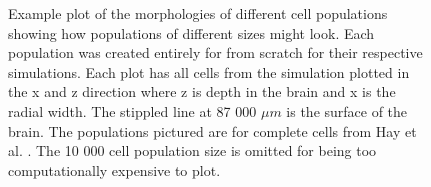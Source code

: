 \documentclass[final, a4paper,masters,en,listoffigures,listoftables,norwegiandates]{NMBU}
\begin{document}
\begin{figure}[htbp]
    \centering
    \caption{Example plot of the morphologies of different cell populations showing how populations of different sizes might look. Each population was created entirely for from scratch for their respective simulations. Each plot has all cells from the simulation plotted in the x and z direction where z is depth in the brain and x is the radial width. The stippled line at 87 000 $\mu m$ is the surface of the brain. The populations pictured are for complete cells from Hay et al. \cite{Hay2011}. The 10 000 cell population size is omitted for being too computationally expensive to plot.}
    \label{fig:popmorphs}
\end{figure}
\end{document}
